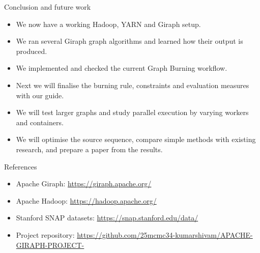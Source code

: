 \documentclass[aspectratio=169]{beamer}
\begin{document}
\begin{frame}{Conclusion and future work}
\begin{itemize}
  \item We now have a working Hadoop, YARN and Giraph setup.
  \item We ran several Giraph graph algorithms and learned how their output is produced.
  \item We implemented and checked the current Graph Burning workflow.
  \item Next we will finalise the burning rule, constraints and evaluation measures with our guide.
  \item We will test larger graphs and study parallel execution by varying workers and containers.
  \item We will optimise the source sequence, compare simple methods with existing research, and prepare a paper from the results.
\end{itemize}
\end{frame}

\begin{frame}{References}
\begin{itemize}
  \item Apache Giraph: \url{https://giraph.apache.org/}
  \item Apache Hadoop: \url{https://hadoop.apache.org/}
  \item Stanford SNAP datasets: \url{https://snap.stanford.edu/data/}
  \item Project repository: \url{https://github.com/25mcmc34-kumarshivam/APACHE-GIRAPH-PROJECT-}
\end{itemize}
\end{frame}
\end{document}

